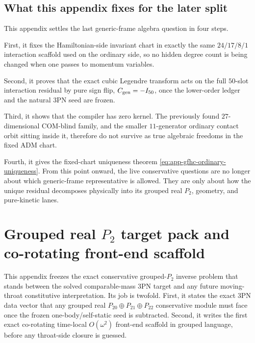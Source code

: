 \documentclass[11pt]{article}
\begin{document}
\subsection{What this appendix fixes for the later split}
\label{app:generic-frame-hamiltonian-compiler-uniqueness-summary}

This appendix settles the last generic-frame algebra question in four
steps.

First, it fixes the Hamiltonian-side invariant chart in exactly the same
$24/17/8/1$ interaction scaffold used on the ordinary side, so no hidden degree
count is being changed when one passes to momentum variables.

Second, it proves that the exact cubic Legendre transform acts on the full
$50$-slot interaction residual by pure sign flip,
\(C_{\rm gen}=-I_{50}\), once the lower-order ledger and the natural $3$PN seed
are frozen.

Third, it shows that the compiler has zero kernel.  The previously found
$27$-dimensional COM-blind family, and the smaller $11$-generator ordinary
contact orbit sitting inside it, therefore do not survive as true algebraic
freedoms in the fixed ADM chart.

Fourth, it gives the fixed-chart uniqueness theorem
\eqref{eq:app-gfhc-ordinary-uniqueness}.  From this point onward, the live
conservative questions are no longer about which generic-frame representative is
allowed.  They are only about how the unique residual decomposes physically into
its grouped real $P_2$, geometry, and pure-kinetic lanes.


\section{Grouped real \texorpdfstring{$P_2$}{P 2} target pack and co-rotating front-end scaffold}
\label{app:grouped-p2-target-pack}

This appendix freezes the exact conservative grouped-$P_2$ inverse problem that
stands between the solved comparable-mass $3$PN target and any future
moving-throat constitutive interpretation.  Its job is twofold.  First, it
states the exact $3$PN data vector that any grouped real
\(
P_{20}\oplus P_{21}\oplus P_{22}
\)
conservative module must face once the frozen one-body/self-static seed is
subtracted.  Second, it writes the first exact co-rotating time-local
\(O(\omega^2)\) front-end scaffold in grouped language, before any throat-side
closure is guessed.
\end{document}
